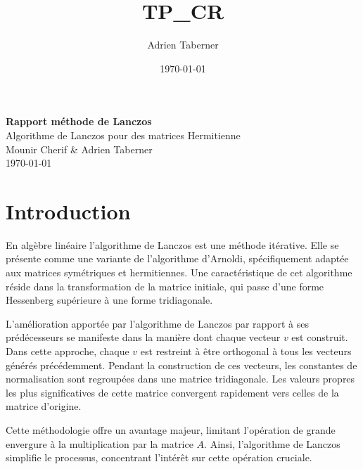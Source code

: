 \documentclass[11pt,french]{article}
\title{TP\_CR}
\author{Adrien Taberner}
\date{ \today}
\begin{document}
	
	\begin{center}
		\vspace*{15pt}
		\huge
		\textbf{Rapport méthode de Lanczos}\\
		\vspace{15pt}
		\LARGE
		Algorithme de Lanczos pour des matrices Hermitienne\\
		\vspace{10pt}	
		\large
		 Mounir Cherif \& Adrien Taberner  \\ 
		 \today  \\
		\vspace{5pt}	
	\end{center} 
	
	\vspace{30pt}	
	\tableofcontents
	
	\newpage
	
	\renewcommand{\headrulewidth}{0.4pt}
	\renewcommand{\footrulewidth }{0.4pt}
	\fancyfoot[C]{}
	\fancyfoot[R]{\thepage}
	
	\section{Introduction}
		\pagestyle{fancy}
	\par En algèbre linéaire l'algorithme de Lanczos est une méthode itérative. Elle se présente comme une variante de l'algorithme d'Arnoldi, spécifiquement adaptée aux matrices symétriques et hermitiennes. Une caractéristique de cet algorithme réside dans la transformation de la matrice initiale, qui passe d'une forme Hessenberg supérieure à une forme tridiagonale. \\

	\par L'amélioration apportée par l'algorithme de Lanczos par rapport à ses prédécesseurs se manifeste dans la manière dont chaque vecteur $v$ est construit. Dans cette approche, chaque $v$ est restreint à être orthogonal à tous les vecteurs générés précédemment. Pendant la construction de ces vecteurs, les constantes de normalisation sont regroupées dans une matrice tridiagonale. Les valeurs propres les plus significatives de cette matrice convergent rapidement vers celles de la matrice d'origine. \\

	\par Cette méthodologie offre un avantage majeur, limitant l'opération de grande envergure à la multiplication par la matrice $A$. Ainsi, l'algorithme de Lanczos simplifie le processus, concentrant l'intérêt sur cette opération cruciale. \\
	
\end{document}
